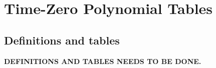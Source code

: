 \chapter{Time-Zero Polynomial Tables}
\section{Definitions and tables}

\noindent\textbf{DEFINITIONS AND TABLES NEEDS TO BE DONE.}


